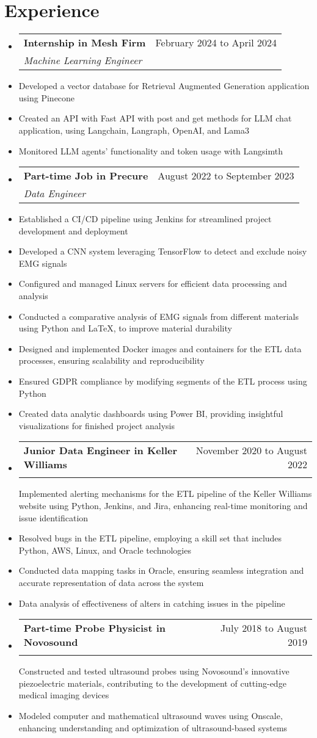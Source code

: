 \documentclass[letterpaper,10pt]{article}
\makeatletter
\newcommand{\resumeItem}[1]{\item\small{#1}}
\newcommand{\resumeSubheading}[4]{
\vspace{-1pt}\item
  \begin{tabular*}{0.97\textwidth}[t]{l@{\extracolsep{\fill}}r}
    \textbf{#1} & #2 \\
    \textit{#3} & \textit{#4} \\
  \end{tabular*}\vspace{-7pt}
}
\newcommand{\resumeSubHeadingList}{\begin{itemize}[leftmargin=0.15in, label={}]}
\newcommand{\resumeSubHeadingListEnd}{\end{itemize}}
\makeatother
\begin{document}
\section{Experience}
\resumeSubHeadingList
  \resumeSubheading
    {Internship in Mesh Firm}{February 2024 to April 2024}{Machine Learning Engineer}{}
    \resumeItem{Developed a vector database for Retrieval Augmented Generation application using Pinecone}
    \resumeItem{Created an API with Fast API with post and get methods for LLM chat application, using Langchain, Langraph, OpenAI, and Lama3}
    \resumeItem{Monitored LLM agents' functionality and token usage with Langsimth}
  \resumeSubheading
    {Part-time Job in Precure}{August 2022 to September 2023}{Data Engineer}{}
    \resumeItem{Established a CI/CD pipeline using Jenkins for streamlined project development and deployment}
    \resumeItem{Developed a CNN system leveraging TensorFlow to detect and exclude noisy EMG signals}
    \resumeItem{Configured and managed Linux servers for efficient data processing and analysis}
    \resumeItem{Conducted a comparative analysis of EMG signals from different materials using Python and LaTeX, to improve material durability}
    \resumeItem{Designed and implemented Docker images and containers for the ETL data processes, ensuring scalability and reproducibility}
    \resumeItem{Ensured GDPR compliance by modifying segments of the ETL process using Python}
    \resumeItem{Created data analytic dashboards using Power BI, providing insightful visualizations for finished project analysis}
  \resumeSubheading
    {Junior Data Engineer in Keller Williams}{November 2020 to August 2022}{}
    \resumeItem{Implemented alerting mechanisms for the ETL pipeline of the Keller Williams website using Python, Jenkins, and Jira, enhancing real-time monitoring and issue identification}
    \resumeItem{Resolved bugs in the ETL pipeline, employing a skill set that includes Python, AWS, Linux, and Oracle technologies}
    \resumeItem{Conducted data mapping tasks in Oracle, ensuring seamless integration and accurate representation of data across the system}
    \resumeItem{Data analysis of effectiveness of alters in catching issues in the pipeline}
  \resumeSubheading
    {Part-time Probe Physicist in Novosound}{July 2018 to August 2019}{}
    \resumeItem{Constructed and tested ultrasound probes using Novosound's innovative piezoelectric materials, contributing to the development of cutting-edge medical imaging devices}
    \resumeItem{Modeled computer and mathematical ultrasound waves using Onscale, enhancing understanding and optimization of ultrasound-based systems}
\resumeSubHeadingListEnd
\end{document}
